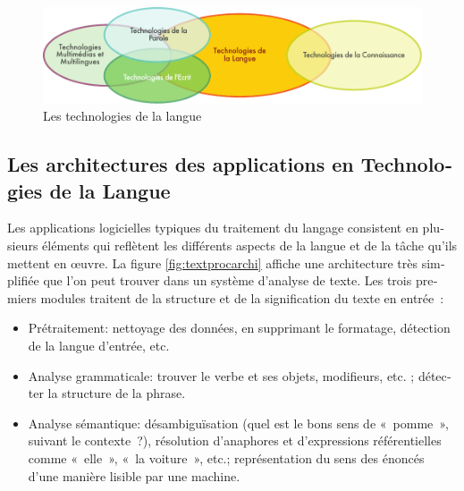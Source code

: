 \begin{french}
\begin{multicols}{2}
\begin{figure}[!ht]

\begin{center}
 \includegraphics[width=\textwidth]{../_media/french/language_technologies} 
\caption{Les technologies de la langue}
\label{fig:languagetechno}
\end{center}
\vspace*{-.2cm}
\end{figure}

\label{fig:ltincontext_en}


\subsection{Les architectures des applications en Technologies de la Langue}

Les applications logicielles typiques du traitement du langage
consistent en plusieurs éléments qui reflètent les différents aspects
de la langue et de la tâche qu'ils mettent en œuvre. La figure \ref{fig:textprocarchi}  
 affiche une architecture très simplifiée que l'on peut trouver
dans un système d'analyse de texte. Les trois premiers modules
traitent de la structure et de la signification du texte en entrée~:
\begin{itemize}
\item Prétraitement: nettoyage des données, en supprimant le
  formatage, détection de la langue d'entrée, etc.

\item Analyse grammaticale: trouver le verbe et ses objets,
  modifieurs, etc. ; détecter la structure de la phrase.

\item Analyse sémantique: désambiguïsation (quel est le bons sens de
  «~pomme~», suivant le contexte~?), résolution d'anaphores et
  d'expressions référentielles comme «~elle~», «~la voiture~», etc.;
  représentation du sens des énoncés d'une manière lisible par une
  machine.
\end{itemize}


\end{multicols}
\end{french}
